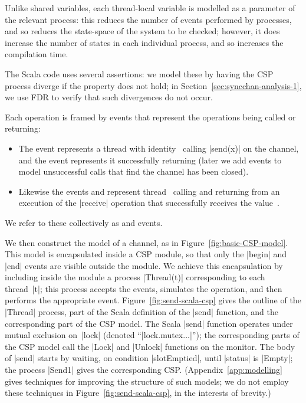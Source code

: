 Unlike shared variables, each thread-local variable is modelled as a parameter
of the relevant process: this reduces the number of events performed by
processes, and so reduces the state-space of the system to be checked;
however, it does increase the number of states in each individual process, and
so increases the compilation time.

The Scala code uses several assertions: we model these by having the CSP
process diverge if the property does not hold; in
Section~\ref{sec:syncchan-analysis-1}, we use FDR to verify that such
divergences do not occur.

Each operation is framed by events that represent the operations being called
or returning:
%
\begin{itemize}
\item The event  represents a thread with
  identity~ calling |send(x)| on the channel, and the event
   represents it successfully returning (later we
  add events to model unsuccessful calls that find the channel has
  been closed).

\item Likewise the events  and
   represent thread~ calling and
  returning from an execution of the |receive| operation that successfully
  receives the value~.
\end{itemize}
%
We refer to these collectively as  and  events.

%

We then construct the model of a channel, as in
Figure~\ref{fig:basic-CSP-model}.  This model is encapsulated inside a CSP
module, so that only the |begin| and |end| events are visible outside the
module.  We achieve this encapsulation by including inside the module a
process |Thread(t)| corresponding to each thread~|t|; this process accepts the
 events, simulates the operation, and then performs the
appropriate  event.  Figure~\ref{fig:send-scala-csp} gives the
outline of the |Thread| process, part of the Scala definition of the |send|
function, and the corresponding part of the CSP model.  The Scala |send|
function operates under mutual exclusion on~|lock| (denoted
``|lock.mutex{...}|''); the corresponding parts of the CSP model call the
|Lock| and |Unlock| functions on the monitor.  The body of |send| starts
by waiting, on condition |slotEmptied|, until |status| is |Empty|; the process
|Send1| gives the corresponding CSP\null.  (Appendix~\ref{app:modelling} gives
techniques for improving the structure of such models; we do not employ these
techniques in Figure~\ref{fig:send-scala-csp}, in the interests of brevity.)

